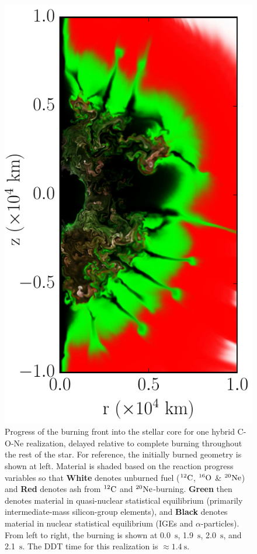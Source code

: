 \documentclass[iop,apj]{emulateapj}
\newcommand{\C}[1]{\ensuremath{{}^{#1}{\rm C}}}
\newcommand{\Ox}[1]{\ensuremath{{}^{#1}{\rm O}}}
\newcommand{\Ne}[1]{\ensuremath{{}^{#1}{\rm Ne}}}
\newcommand{\unitstyle}[1]{\ensuremath{\mathrm{#1}}}
\newcommand{\second}{\unitstyle{s}}
\begin{document}
\begin{figure}[!ht]
\begin{minipage}{0.24\textwidth}
    \includegraphics[width=\linewidth]{"figures/flash_simulations/delayed-core/mpole-16_amp-12/cone_400k_m16_a12_0210"}
  \end{minipage} \caption{\label{fig:cone_delayed_core} Progress of the burning front into the stellar core for one hybrid C-O-Ne realization, delayed relative to complete burning throughout the rest of the star. For reference, the initially burned geometry is shown at left. Material is shaded based on the reaction progress variables so that \textbf{White} denotes unburned fuel (\C{12}, \Ox{16} \& \Ne{20}) and \textbf{Red} denotes ash from \C{12} and \Ne{20}-burning. \textbf{Green} then denotes material in quasi-nuclear statistical equilibrium (primarily intermediate-mass silicon-group elements), and \textbf{Black} denotes material in nuclear statistical equilibrium (IGEs and $\alpha$-particles). From left to right, the burning is shown at 0.0~\second, 1.9~\second, 2.0~\second, and 2.1~\second. The DDT time for this realization is $\approx \mathrm{1.4}~\second$.}
\end{figure}
\end{document}
